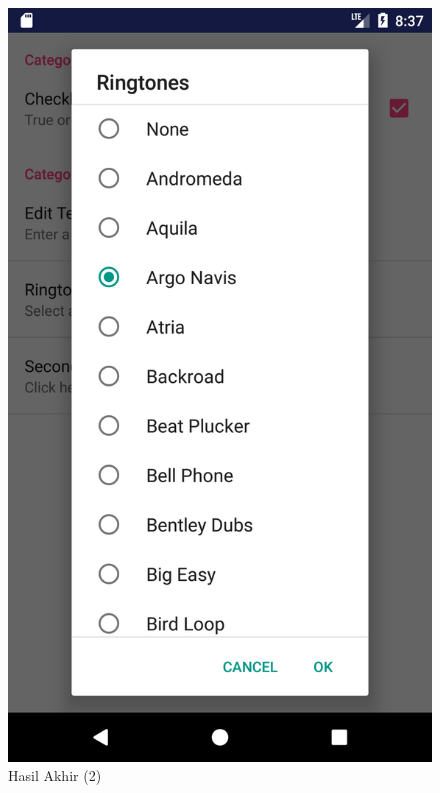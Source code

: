 \documentclass{scrartcl}
\begin{document}
\begin{enumerate}
\begin{figure}[htbp]
\begin{minipage}{.5\textwidth}
				\includegraphics[width=0.7\linewidth]{Screenshot_1497490686}
				\caption{Hasil Akhir (2)}
				\label{fig:screenshot_1497490686}
			\end{minipage}
		\end{figure}
	

\end{enumerate}
\end{document}
